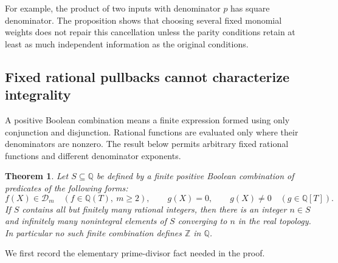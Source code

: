 \documentclass[11pt]{article}
\newtheorem{theorem}{Theorem}[section]
\theoremstyle{definition}
\begin{document}
For example, the product of two inputs with denominator $p$ has square
denominator.  The proposition shows that choosing several fixed
monomial weights does not repair this cancellation unless the parity
conditions retain at least as much independent information as the
original conditions.

\subsection{Fixed rational pullbacks cannot characterize integrality}

A positive Boolean combination means a finite expression formed using
only conjunction and disjunction.  Rational functions are evaluated
only where their denominators are nonzero.  The result below permits
arbitrary fixed rational functions and different denominator exponents.

\begin{theorem}\label{thm:finite-denominator-tests}
Let $S\subseteq\mathbb Q$ be defined by a finite positive Boolean
combination of predicates of the following forms:
\[
 f(X)\in\mathcal D_m\quad(f\in\mathbb Q(T),\ m\ge2),
 \qquad g(X)=0,\qquad g(X)\ne0
 \quad(g\in\mathbb Q[T]).
\]
If $S$ contains all but finitely many rational integers, then there is
an integer $n\in S$ and infinitely many nonintegral elements of $S$
converging to $n$ in the real topology.  In particular no such finite
combination defines $\mathbb Z$ in $\mathbb Q$.
\end{theorem}

We first record the elementary prime-divisor fact needed in the proof.
\end{document}
